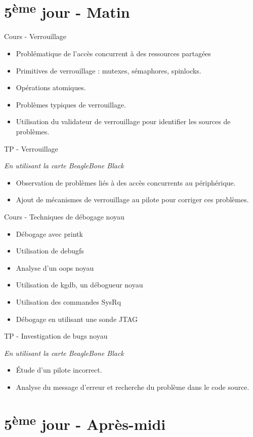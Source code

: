 \documentclass[a4paper,12pt,obeyspaces,spaces,hyphens]{article}
\begin{document}
\section{5\textsuperscript{ème} jour - Matin}

\feagendatwocolumn
{Cours - Verrouillage}
{
  \begin{itemize}
  \item Problématique de l'accès concurrent à des ressources partagées
  \item Primitives de verrouillage : mutexes, sémaphores, spinlocks.
  \item Opérations atomiques.
  \item Problèmes typiques de verrouillage.
  \item Utilisation du validateur de verrouillage pour identifier les
    sources de problèmes.
  \end{itemize}
}
{TP - Verrouillage}
{
  {\em En utilisant la carte BeagleBone Black}
  \begin{itemize}
  \item Observation de problèmes liés à des accès concurrents au
    périphérique.
  \item Ajout de mécanismes de verrouillage au pilote pour corriger
    ces problèmes.
  \end{itemize}
}

\feagendatwocolumn
{Cours - Techniques de débogage noyau}
{
  \begin{itemize}
  \item Débogage avec printk
  \item Utilisation de debugfs
  \item Analyse d'un oops noyau
  \item Utilisation de kgdb, un débogueur noyau
  \item Utilisation des commandes SysRq
  \item Débogage en utilisant une sonde JTAG
  \end{itemize}
}
{TP - Investigation de bugs noyau}
{
  {\em En utilisant la carte BeagleBone Black}
  \begin{itemize}
  \item Étude d'un pilote incorrect.
  \item Analyse du message d'erreur et recherche du problème dans le code
    source.
  \end{itemize}
}

\section{5\textsuperscript{ème} jour - Après-midi}
\end{document}

